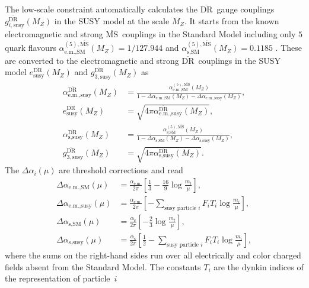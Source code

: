 \documentclass[final,3p,11pt,pdflatex]{elsarticle}
\newcommand{\textoverline}[1]{$\overline{\mbox{#1}}$}
\newcommand{\DRbar}{\textoverline{DR}\xspace}
\newcommand{\MSbar}{\textoverline{MS}\xspace}
\begin{document}
The low-scale constraint automatically calculates the \DRbar\ gauge
couplings $g_{i,\text{susy}}^{\text{\DRbar}}(M_Z)$ in the SUSY model
at the scale $M_Z$.  It starts from the known electromagnetic and
strong \MSbar\ couplings in the Standard Model including only $5$
quark flavours
$\alpha_{\text{e.m.},\text{SM}}^{(5),\text{\MSbar}}(M_Z) = 1/127.944$
and $\alpha_{\text{s},\text{SM}}^{(5),\text{\MSbar}}(M_Z) = 0.1185$
\cite{Beringer:1900zz}.  These are converted to the electromagnetic
and strong \DRbar\ couplings in the SUSY model
$e_{\text{susy}}^{\text{\DRbar}}(M_Z)$ and
$g_{3,\text{susy}}^{\text{\DRbar}}(M_Z)$ as
%
\begin{align}
  \alpha_{\text{e.m.},\text{susy}}^{\text{\DRbar}}(M_Z) &=
  \frac{\alpha_{\text{e.m.},\text{SM}}^{(5),\text{\MSbar}}(M_Z)}{1 -
    \Delta\alpha_{\text{e.m.},\text{SM}}(M_Z) -
    \Delta\alpha_{\text{e.m.},\text{susy}}(M_Z)} ,\\
    e_{\text{susy}}^{\text{\DRbar}}(M_Z) &=
    \sqrt{4\pi\alpha_{\text{e.m.},\text{susy}}^{\text{\DRbar}}(M_Z)}, \\
  \alpha_{\text{s},\text{susy}}^{\text{\DRbar}}(M_Z) &=
  \frac{\alpha_{\text{s},\text{SM}}^{(5),\text{\MSbar}}(M_Z)}{1 -
    \Delta\alpha_{\text{s},\text{SM}}(M_Z)
    - \Delta\alpha_{\text{s},\text{susy}}(M_Z)} ,\\
  g_{3,\text{susy}}^{\text{\DRbar}}(M_Z) &=
  \sqrt{4\pi\alpha_{\text{s},\text{susy}}^{\text{\DRbar}}(M_Z)} .
\end{align}
%
The $\Delta\alpha_i(\mu)$ are threshold corrections and read
%
\begin{align}
  \Delta\alpha_{\text{e.m.},\text{SM}}(\mu) &=
  \frac{\alpha_\text{e.m.}}{2\pi} \left[\frac{1}{3}
    - \frac{16}{9} \log{\frac{m_t}{\mu}} \right],\\
  \Delta\alpha_{\text{e.m.},\text{susy}}(\mu) &=
  \frac{\alpha_\text{e.m.}}{2\pi} \left[ -\sum_{\text{susy particle }
      i}
    F_i T_i \log{\frac{m_i}{\mu}} \right],\\
  \Delta\alpha_{\text{s},\text{SM}}(\mu) &=
  \frac{\alpha_\text{s}}{2\pi} \left[
    -\frac{2}{3} \log{\frac{m_t}{\mu}} \right],\\
  \Delta\alpha_{\text{s},\text{susy}}(\mu) &=
  \frac{\alpha_\text{s}}{2\pi}\left[ \frac{1}{2}-\sum_{\text{susy
        particle } i} F_i T_i \log{\frac{m_i}{\mu}} \right] ,
\end{align}
%
where the sums on the right-hand sides run over all electrically and
color charged fields absent from the Standard Model.  The constants
$T_i$ are the dynkin indices of the representation of particle~$i$
\end{document}
